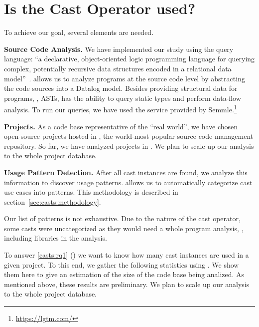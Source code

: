 \section{Is the Cast Operator used?}
\label{sec:casts:stats}







To achieve our goal, several elements are needed.

\textbf{Source Code Analysis.}
We have implemented our study using the \ql{} query language:
``a declarative, object-oriented logic programming language for querying complex, potentially recursive data structures encoded in a relational data model''~\citep{avgustinovQLObjectorientedQueries2016}.
\ql{} allows us to analyze programs at the source code level by abstracting the code sources into a Datalog model.
Besides providing structural data for programs, \ie{}, ASTs,
\ql{} has the ability to query static types and perform data-flow analysis.
To run our \ql{} queries, we have used the service provided by Semmle.\footnote{\url{https://lgtm.com/}} 

\textbf{Projects.} 
As a code base representative of the ``real world'',
we have chosen open-source projects hosted in 
\github{},
the world-most popular source code management repository.
So far, we have analyzed \nproject{} \java{} projects in \lgtm{}.
We plan to scale up our analysis to the whole \lgtm{} project database.

\textbf{Usage Pattern Detection.}
After all cast instances are found, we analyze this information to discover usage patterns.
\ql{} allows us to automatically categorize cast use cases into patterns.
This methodology is described in section~\ref{sec:casts:methodology}.

Our list of patterns is not exhaustive.
Due to the nature of the cast operator, some casts were uncategorized as they would need a whole program analysis, \eg{}, including libraries in the analysis.









To answer \ref{casts:rq1} (\emph{\crqA}) we want to know how many cast instances are used in a given project.
To this end, we gather the following statistics using \ql{}.
We show them here to give an estimation of the size of the code base being analized.
As mentioned above, these results are preliminary.
We plan to scale up our analysis to the whole \lgtm{} project database.

